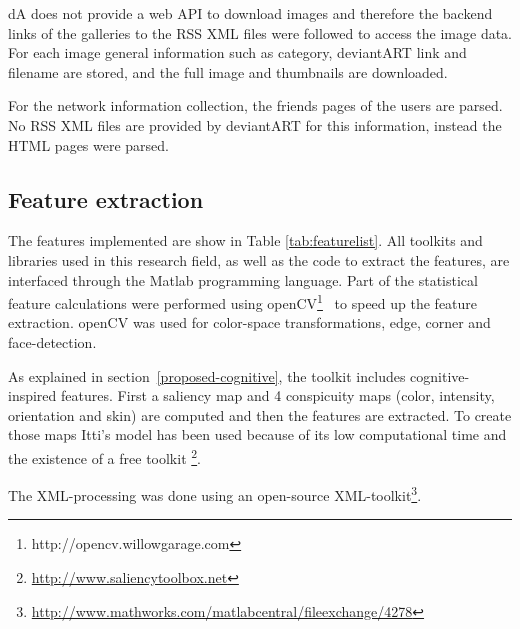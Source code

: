 dA does not provide a web API to download images and therefore the backend links of the galleries to the RSS XML files were followed to access the image data.
For each image general information such as category, deviantART link and filename are stored, and the full image and 
thumbnails are downloaded.

For the network information collection, the friends pages of the users are parsed. No RSS XML files are provided by deviantART for this information, instead the HTML pages were parsed.


\subsection{Feature extraction}
The features implemented are show in Table \ref{tab:featurelist}.
All toolkits and libraries used in this research field, as well as the code to extract the features, are interfaced through the Matlab programming language.
Part of the statistical feature calculations were performed using openCV\footnote{http://opencv.willowgarage.com}~\cite{openCV} to speed up the feature extraction. openCV was used for color-space transformations, edge, corner and face-detection.

As explained in section~\ref{proposed-cognitive}, the toolkit includes cognitive-inspired features. First a saliency map and 4 conspicuity maps (color, intensity, orientation and skin) are computed and then the features are extracted. To create those maps Itti's model \cite{Itti_model} has been used because of its low computational time and the existence of a free toolkit \footnote{\url{http://www.saliencytoolbox.net}}. 

The XML-processing was done using an open-source XML-toolkit\footnote{\url{http://www.mathworks.com/matlabcentral/fileexchange/4278}}.

